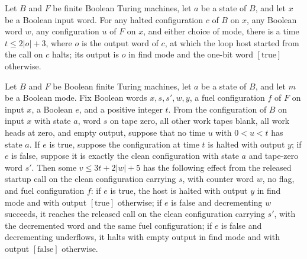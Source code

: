 \begin{lemma}
\label{Turing.FinTM.loopHost_accept}
\leanok
{}
Let $B$ and $F$ be finite Boolean Turing machines, let $a$ be a state of $B$, and let
$x$ be a Boolean input word. For any halted configuration $c$ of $B$ on $x$, any Boolean
word $w$, any configuration $u$ of $F$ on $x$, and either choice of mode, there is a
time $t \le 2|o|+3$, where $o$ is the output word of $c$, at which the loop host started
from the call on $c$ halts; its output is $o$ in find mode and the one-bit word
$[\mathrm{true}]$ otherwise.
\end{lemma}

\begin{lemma}
\label{Turing.FinTM.loopHost_round}
\leanok
{}
Let $B$ and $F$ be Boolean finite Turing machines, let $a$ be a state of $B$, and let
$m$ be a Boolean mode. Fix Boolean words $x,s,s',w,y$, a fuel configuration $f$ of $F$
on input $x$, a Boolean $e$, and a positive integer $t$. From the configuration of $B$
on input $x$ with state $a$, word $s$ on tape zero, all other work tapes blank, all work
heads at zero, and empty output, suppose that no time $u$ with $0<u<t$ has state $a$. If
$e$ is true, suppose the configuration at time $t$ is halted with output $y$; if $e$ is
false, suppose it is exactly the clean configuration with state $a$ and tape-zero word
$s'$. Then some $v\le 3t+2|w|+5$ has the following effect from the released startup call
on the clean configuration carrying $s$, with counter word $w$, no flag, and fuel
configuration $f$: if $e$ is true, the host is halted with output $y$ in find mode and
with output $[\mathrm{true}]$ otherwise; if $e$ is false and decrementing $w$ succeeds,
it reaches the released call on the clean configuration carrying $s'$, with the
decremented word and the same fuel configuration; if $e$ is false and decrementing
underflows, it halts with empty output in find mode and with output $[\mathrm{false}]$
otherwise.
\end{lemma}

